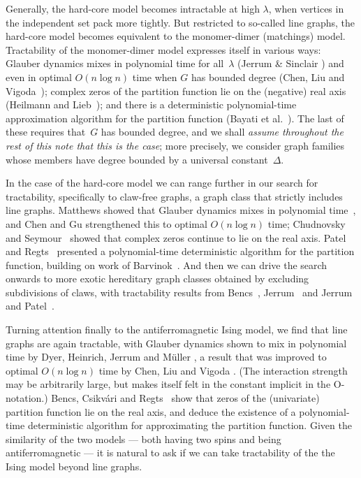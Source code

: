 \documentclass[11pt]{amsart}
\begin{document}
Generally, the hard-core model becomes intractable at high $\lambda$, when vertices in the independent set pack more tightly.   But restricted to so-called line graphs, the hard-core model becomes equivalent to the monomer-dimer (matchings) model.  Tractability of the monomer-dimer model expresses itself in various ways: Glauber dynamics mixes in polynomial time for all~$\lambda$ (Jerrum \& Sinclair \cite{JerrumSinclair}) and even in optimal $O(n\log n)$ time when $G$ has bounded degree (Chen, Liu and Vigoda~\cite{ChenLiuVigodaOptimal});  complex zeros of the partition function lie on the (negative) real axis (Heilmann and Lieb~\cite{HeilmannLieb});  and  there is a deterministic polynomial-time approximation algorithm for the partition function (Bayati et al.~\cite{BayatiEtAl}).  The last of these requires that~$G$ has bounded degree, and we shall \emph{assume throughout the rest of this note that this is the case};  more precisely, we consider graph families whose members have degree bounded by a universal constant~$\Delta$.   

In the case of the hard-core model we can range further in our search for tractability, specifically to claw-free graphs, a graph class that strictly includes line graphs.   Matthews showed that Glauber dynamics mixes in polynomial time~\cite{Matthews}, and Chen and Gu \cite{ChenGu} strengthened this to optimal $O(n\log n)$ time; Chudnovsky and Seymour~\cite{ChudnovskySeymour} showed that complex  zeros continue to lie on the real axis.  Patel and Regts~\cite{PatelRegts} presented a polynomial-time deterministic algorithm for the partition function, building on work of Barvinok~\cite{Barvinok}.  And then we can drive the search onwards to more exotic hereditary graph classes obtained by excluding subdivisions of claws, with tractability results from Bencs~\cite{BencsPhD}, Jerrum~\cite{JerrumHfree} and Jerrum and Patel~\cite{JerrumPatel}.

Turning attention finally to the antiferromagnetic Ising model, we find that line graphs are again tractable, with Glauber dynamics shown to mix in polynomial time by Dyer, Heinrich, Jerrum and M\"uller \cite{DyerHeinrichJerrumMuller}, a result that was improved to optimal $O(n\log n)$ time by Chen, Liu and Vigoda \cite{ChenLiuVigodaHolant}.  (The interaction strength may be arbitrarily large, but makes itself felt in the constant implicit in the O-notation.) Bencs, Csikv\'ari and Regts~\cite{BencsCsikvariRegts} show that zeros of the (univariate) partition function lie on the real axis, and deduce the existence of a polynomial-time deterministic algorithm for approximating the partition function. Given the similarity of the two models --- both having two spins and being antiferromagnetic --- it is natural to ask if we can take tractability of the the Ising model beyond line graphs. 
\end{document}
